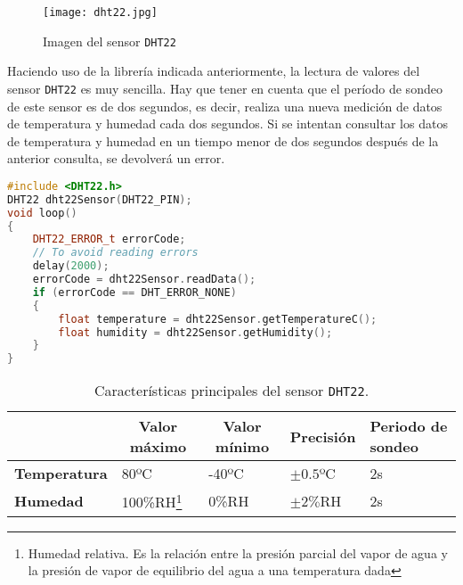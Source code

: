 \begin{wrapfigure}{r}{0.2\linewidth}
    \centering
    \texttt{[image: dht22.jpg]}
    \caption{Imagen del sensor \texttt{DHT22} \protect\footnotemark}
    \label{fig:myfig}
\end{wrapfigure}


Haciendo uso de la librería indicada anteriormente, la lectura de valores del sensor \texttt{DHT22} es muy sencilla. Hay que tener en cuenta que el período de sondeo de este sensor es de dos segundos, es decir, realiza una nueva medición de datos de temperatura y humedad cada dos segundos. Si se intentan consultar los datos de temperatura y humedad en un tiempo menor de dos segundos después de la anterior consulta, se devolverá un error.
\begin{lstlisting}[language=c++,captionpos=t,caption={\textbf{Ejemplo de toma de datos del sensor \texttt{DHT22}.}},label={lst:dht22ex}]
#include <DHT22.h>
DHT22 dht22Sensor(DHT22_PIN);
void loop()
{
    DHT22_ERROR_t errorCode;
    // To avoid reading errors
    delay(2000);
    errorCode = dht22Sensor.readData();
    if (errorCode == DHT_ERROR_NONE)
    {
        float temperature = dht22Sensor.getTemperatureC();
        float humidity = dht22Sensor.getHumidity();
    }
}
\end{lstlisting}

\begin{table}[!h]
\centering
\begin{tabular}{l|l|l|l|l|}
\cline{2-5}
                                  & \multicolumn{1}{c|}{\textbf{Valor máximo}}                                                                                                                                & \multicolumn{1}{c|}{\textbf{Valor mínimo}} & \textbf{Precisión}   & \textbf{Periodo de sondeo} \\ \hline
\multicolumn{1}{|l|}{\textbf{Temperatura}} & 80ºC                                                                                                                                                             & -40ºC                             & $\pm 0.5$ºC & 2s                \\ \hline
\multicolumn{1}{|l|}{\textbf{Humedad}}     & 100\%RH\footnote{Humedad relativa. Es la relación entre la presión parcial del vapor de agua y la presión de vapor de equilibrio del agua a una temperatura dada} & 0\%RH                              & $\pm2\%$RH   & 2s                \\ \hline
\end{tabular}
\caption{Características principales del sensor \texttt{DHT22}.}
\label{table:dht22caract}
\end{table}

